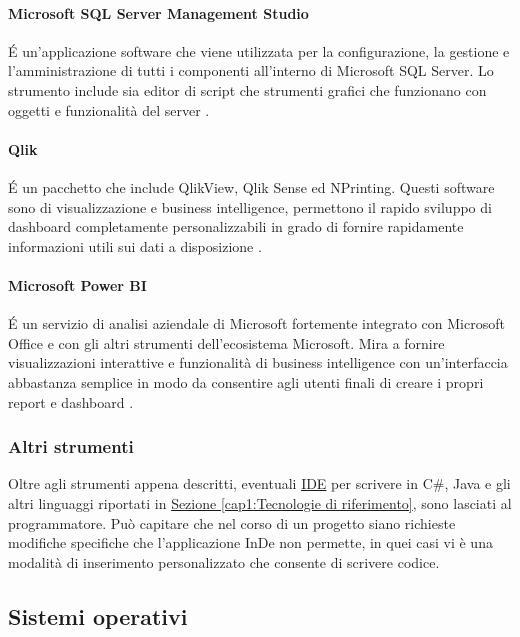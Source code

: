 \paragraph{Microsoft SQL Server Management Studio} \'E un'applicazione software che viene utilizzata per la configurazione, la gestione e l'amministrazione di tutti i componenti all'interno di Microsoft SQL Server. Lo strumento include sia editor di script che strumenti grafici che funzionano con oggetti e funzionalità del server \hyperref[bib8]{\cite{[8]}}.

\paragraph{Qlik}\'E un pacchetto che include QlikView, Qlik Sense ed NPrinting. Questi software sono di visualizzazione e business intelligence, permettono il rapido sviluppo di dashboard completamente personalizzabili in grado di fornire rapidamente informazioni utili sui dati a disposizione \hyperref[bib9]{\cite{[9]}}.

\paragraph{Microsoft Power BI}
\'E un servizio di analisi aziendale di Microsoft fortemente integrato con Microsoft Office e con gli altri strumenti dell'ecosistema Microsoft. Mira a fornire visualizzazioni interattive e funzionalità di business intelligence con un'interfaccia abbastanza semplice in modo da consentire agli utenti finali di creare i propri report e dashboard \hyperref[bib10]{\cite{[10]}}.

\subsubsection*{Altri strumenti}
Oltre agli strumenti appena descritti, eventuali \hyperref[IDE]{IDE} per scrivere in C\#, Java e gli altri linguaggi riportati in \hyperref[cap1:Tecnologie di riferimento]{Sezione \ref{cap1:Tecnologie di riferimento}}, sono lasciati al programmatore. Può capitare che nel corso di un progetto siano richieste  modifiche specifiche che l'applicazione InDe non permette, in quei casi vi è una modalità di inserimento personalizzato che consente di scrivere codice.



\subsection{Sistemi operativi}
\label{cap1:Sistemi operativi}

